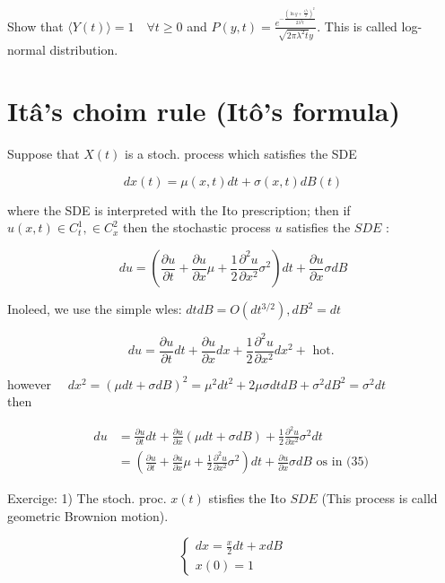 \documentclass[10pt]{article}
\begin{document}
Show that $\langle Y(t)\rangle=1 \quad \forall t \geqslant 0$ and $P(y, t)=\frac{e^{-\frac{\left(\ln y+\frac{\lambda^{2} t}{2}\right)^{2}}{2 \lambda^{2} t}}}{\sqrt{2 \pi \lambda^{2} t} y}$. This is called log-normal distribution.

\section*{Itâ's choim rule (Itô's formula)}
Suppose that $X(t)$ is a stoch. process which satisfies the SDE

$$
d x(t)=\mu(x, t) d t+\sigma(x, t) d B(t)
$$

where the SDE is interpreted with the Ito prescription; then if $u(x, t) \in C_{t}^{1}, \in C_{x}^{2}$ then the stochastic process $u$ satisfies the $S D E$ :


\begin{equation*}
d u=\left(\frac{\partial u}{\partial t}+\frac{\partial u}{\partial x} \mu+\frac{1}{2} \frac{\partial^{2} u}{\partial x^{2}} \sigma^{2}\right) d t+\frac{\partial u}{\partial x} \sigma d B \tag{35}
\end{equation*}


Inoleed, we use the simple wles: $d t d B=O\left(d t^{3 / 2}\right), d B^{2}=d t$

$$
d u=\frac{\partial u}{\partial t} d t+\frac{\partial u}{\partial x} d x+\frac{1}{2} \frac{\partial^{2} u}{\partial x^{2}} d x^{2}+\text { hot. }
$$

however $\quad d x^{2}=(\mu d t+\sigma d B)^{2}=\mu^{2} d t^{2}+2 \mu \sigma d t d B+\sigma^{2} d B^{2}=\sigma^{2} d t$\\
then

$$
\begin{aligned}
d u & =\frac{\partial u}{\partial t} d t+\frac{\partial u}{\partial x}(\mu d t+\sigma d B)+\frac{1}{2} \frac{\partial^{2} u}{\partial x^{2}} \sigma^{2} d t \\
& =\left(\frac{\partial u}{\partial t}+\frac{\partial u}{\partial x} \mu+\frac{1}{2} \frac{\partial^{2} u}{\partial x^{2}} \sigma^{2}\right) d t+\frac{\partial u}{\partial x} \sigma d B \text { os in (35) }
\end{aligned}
$$

Exercige: 1) The stoch. proc. $x(t)$ stisfies the Ito $S D E$ (This process is calld geometric Brownion motion).

$$
\left\{\begin{array}{l}
d x=\frac{x}{2} d t+x d B \\
x(0)=1
\end{array}\right.
$$
\end{document}
